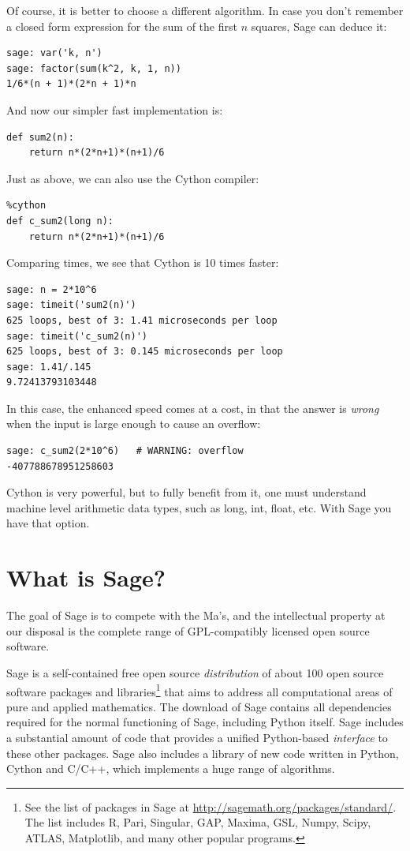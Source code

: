 \documentclass[multi]{cambridge7A}
\theoremstyle{plain}%
\theoremstyle{definition}
\begin{document}
Of course, it is better to choose a different algorithm.  In case you
don't remember a closed form expression for the sum of the first $n$
squares, Sage can deduce it:
\begin{lstlisting}
sage: var('k, n')
sage: factor(sum(k^2, k, 1, n))
1/6*(n + 1)*(2*n + 1)*n
\end{lstlisting}
And now our simpler fast implementation is:
\begin{lstlisting}
def sum2(n):
    return n*(2*n+1)*(n+1)/6
\end{lstlisting}
Just as above, we can also use the Cython compiler:
\begin{lstlisting}
%cython
def c_sum2(long n):
    return n*(2*n+1)*(n+1)/6
\end{lstlisting}
Comparing times, we see that Cython is 10 times faster:
\begin{lstlisting}
sage: n = 2*10^6
sage: timeit('sum2(n)')
625 loops, best of 3: 1.41 microseconds per loop
sage: timeit('c_sum2(n)')
625 loops, best of 3: 0.145 microseconds per loop
sage: 1.41/.145
9.72413793103448
\end{lstlisting}
In this case, the enhanced speed comes at a cost, in that the answer
is {\em wrong} when the input  is large enough to cause an overflow:
\begin{lstlisting}
sage: c_sum2(2*10^6)   # WARNING: overflow
-407788678951258603
\end{lstlisting}
Cython is very powerful, but to fully benefit from it, one must
understand machine level arithmetic data types, such as long, int,
float, etc.  With Sage you have that option.

\section{What is Sage?}\label{sec:what}

The goal of Sage is to compete with the Ma's, and the intellectual
property at our disposal is the complete range of GPL-compatibly
licensed open source software.

Sage is a self-contained free open source {\em distribution} of about
100 open source software packages and libraries\footnote{See the list
  of packages in Sage at \url{http://sagemath.org/packages/standard/}.
  The list includes R, Pari, Singular, GAP, Maxima, GSL, Numpy, Scipy,
  ATLAS, Matplotlib, and many other popular programs.}  that aims to
address all computational areas of pure and applied mathematics.  The
download of Sage contains all dependencies required for the normal
functioning of Sage, including Python itself.  Sage includes a
substantial amount of code that provides a unified Python-based {\em
  interface} to these other packages.  Sage also includes a library of
new code written in Python, Cython and C/C++, which implements a huge
range of algorithms.
\end{document}
